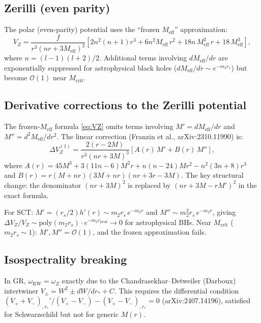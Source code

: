 \documentclass[11pt,a4paper]{article}
\newcommand{\order}[1]{\mathcal{O}(#1)}
\newcommand{\Mcrit}{M_{\mathrm{crit}}}
\begin{document}
\subsection{Zerilli (even parity)}

The polar (even-parity) potential uses the ``frozen $M_{\mathrm{eff}}$''
approximation:
\begin{equation}\label{eq:VZ}
V_Z = \frac{f}{r^3(nr + 3M_{\mathrm{eff}})^2}
\left[2n^2(n+1)r^3 + 6n^2 M_{\mathrm{eff}}\,r^2
+ 18n\,M_{\mathrm{eff}}^2\,r + 18\,M_{\mathrm{eff}}^3\right],
\end{equation}
where $n = (l-1)(l+2)/2$. Additional terms involving
$dM_{\mathrm{eff}}/dr$ are exponentially suppressed for astrophysical
black holes ($dM_{\mathrm{eff}}/dr \sim e^{-m_2 r_s}$) but become $\order{1}$
near $\Mcrit$.

\subsection{Derivative corrections to the Zerilli potential}

The frozen-$M_{\mathrm{eff}}$ formula \eqref{eq:VZ} omits terms involving
$M' = dM_{\mathrm{eff}}/dr$ and $M'' = d^2M_{\mathrm{eff}}/dr^2$.
The linear correction (Franzin et al., arXiv:2310.11990) is:
\begin{equation}
\Delta V_Z^{(1)} = \frac{2(r - 2M)}{r^3(nr+3M)^3}
\left[A(r)\,M' + B(r)\,M''\right],
\end{equation}
where $A(r) = 45M^3 + 3(11n-6)M^2 r + n(n-24)Mr^2 - n^2(3n+8)r^3$
and $B(r) = r(M+nr)(3M+nr)(nr+3r-3M)$.
The key structural change: the denominator $(nr+3M)^2$ is replaced by
$(nr+3M-rM')^2$ in the exact formula.

For SCT: $M' = (r_s/2)h'(r) \sim m_2 r_s\, e^{-m_2 r}$ and
$M'' \sim m_2^2 r_s\, e^{-m_2 r}$, giving
$\Delta V_Z/V_Z \sim \mathrm{poly}(m_2 r_s)\cdot e^{-m_2 r_{\mathrm{peak}}}
\to 0$ for astrophysical BHs.
Near $\Mcrit$ ($m_2 r_s \sim 1$): $M', M'' = \order{1}$, and the
frozen approximation fails.

\subsection{Isospectrality breaking}

In GR, $\omega_{\mathrm{RW}} = \omega_Z$ exactly due to the
Chandrasekhar--Detweiler (Darboux) intertwiner $V_\pm = W^2 \pm dW/dr_* + C$.
This requires the differential condition
$(V_+ + V_-)_{,r_*}' / (V_+ - V_-) - (V_+ - V_-)_{,r_*} = 0$
(arXiv:2407.14196), satisfied for Schwarzschild but not for generic $M(r)$.
\end{document}
